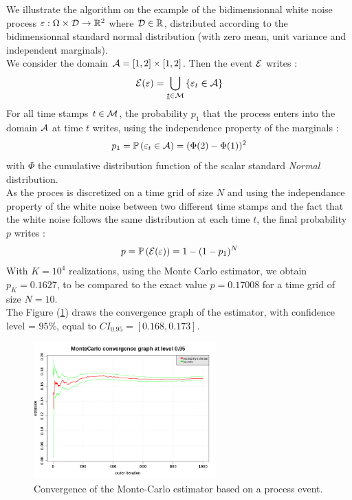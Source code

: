 We illustrate the algorithm on the example  of the  bidimensionnal white noise process $\varepsilon: \Omega \times {\mathcal D} \rightarrow {\mathbb R}^2$ where ${\mathcal D}\in {\mathbb R}$, distributed according to the bidimensionnal standard normal distribution (with zero mean, unit variance  and independent marginals).\\
We consider the domain  ${\mathcal A} =  [1,2] \times [1,2]$. Then the event ${\mathcal E}$ writes :
\begin{align*}
  \displaystyle {\mathcal E}(\varepsilon) = \bigcup_{{\underline{t}}\in {\mathcal M}}\left\{\varepsilon_{t}  \in {\mathcal A}  \right\}
\end{align*}
For all time stamps $t \in {\mathcal M}$, the probability $p_1$ that the process enters into the domain ${\mathcal A}$ at time $t$ writes, using the independence property of the marginals :
\begin{align*}
  p_1 = {\mathbb P}\left( \varepsilon_t  \in {\mathcal A} \right) = (\Phi(2) - \Phi(1))^2
\end{align*}
with $\Phi$ the cumulative distribution function of the scalar standard \textit{Normal} distribution.\\
As the proces is discretized on a time grid of size $N$ and using the independance property of the white noise between two different time stamps and the fact that the white noise follows the same distribution at each time $t$, the final probability $p$  writes :
\begin{equation}\label{pexact}
  p = {\mathbb P}\left( {\mathcal E}(\varepsilon) \right) = 1 - (1 - p_1)^{N}
\end{equation}
With $K=10^4$ realizations, using the Monte Carlo estimator, we obtain $p_K = 0.1627$, to be compared to the exact value $p=0.17008$ for a time grid of size $N=10$.\\

The Figure (\ref{mc_eventprocess_convergency}) draws the convergence graph of the estimator, with confidence level = $95\%$, equal to $CI_{0.95}= [0.168, 0.173]$.\\

\begin{figure}[H]
  \begin{center}
    \includegraphics[width=7cm]{Figures/MonteCarloEventProcessConvergency.png}
    \caption{Convergence of the Monte-Carlo estimator based on a process event.}
    \label{mc_eventprocess_convergency}
  \end{center}
\end{figure}

